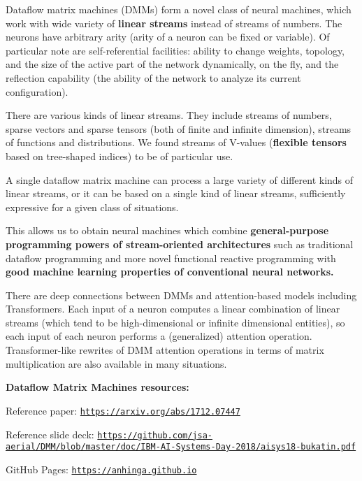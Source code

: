 \documentclass{article}
\begin{document}
Dataflow matrix machines (DMMs) form a novel class of neural machines, which work with wide variety
of {\bf linear streams} instead of streams of numbers. The neurons have
arbitrary arity (arity of a neuron can be fixed or variable). Of particular note are
self-referential facilities: ability to change weights, topology, and the size of the active part of the network dynamically, on the fly,
and the reflection capability (the ability of the network to analyze its current configuration).

There are various kinds of linear streams. They include streams of numbers, sparse vectors and sparse tensors (both of
finite and infinite dimension), streams of functions and distributions. We found streams of V-values
({\bf flexible tensors} based on tree-shaped indices) to be of particular use.

A single dataflow matrix machine can process a large variety of different kinds of linear streams, or
it can be based on a single kind of linear streams, sufficiently expressive for a given class of situations.

This allows us to obtain 
neural machines which combine {\bf general-purpose programming powers of stream-oriented
architectures} such as traditional dataflow programming and
more novel functional reactive programming with {\bf good machine learning
properties of conventional neural networks.}

There are deep connections between DMMs and attention-based models including Transformers.
Each input of a neuron computes a linear combination of linear streams (which tend to be high-dimensional
or infinite dimensional entities), so each input of each neuron performs a (generalized) attention operation.
Transformer-like rewrites of DMM attention operations in terms of matrix multiplication are also available in many situations.

\vspace{0.1in}
\noindent
{\bf Dataflow Matrix Machines resources:}

Reference paper: \href{https://arxiv.org/abs/1712.07447}{\tt https://arxiv.org/abs/1712.07447}

Reference slide deck: \href{https://github.com/jsa-aerial/DMM/blob/master/doc/IBM-AI-Systems-Day-2018/aisys18-bukatin.pdf}{\scriptsize\tt https://github.com/jsa-aerial/DMM/blob/master/doc/IBM-AI-Systems-Day-2018/aisys18-bukatin.pdf}

GitHub Pages: \href{https://anhinga.github.io/}{\tt https://anhinga.github.io}
\end{document}
